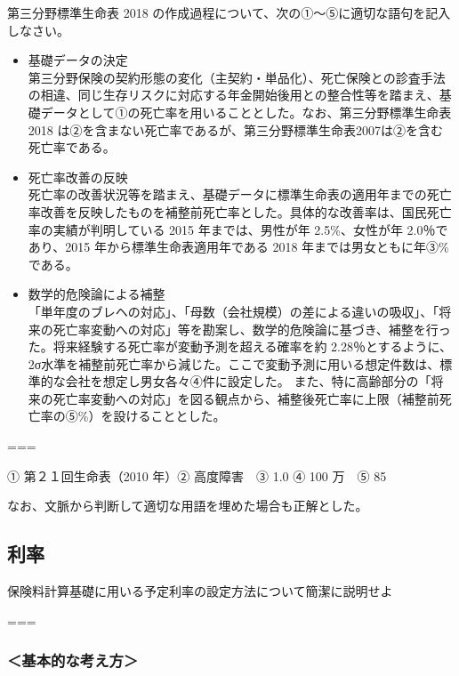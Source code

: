 \documentclass[report,gutter=10mm,fore-edge=10mm,uplatex,dvipdfmx]{jlreq}
\begin{document}

第三分野標準生命表 2018
の作成過程について、次の①～⑤に適切な語句を記入しなさい。

\begin{itemize}
\tightlist
\item
  基礎データの決定\\
  第三分野保険の契約形態の変化（主契約・単品化）、死亡保険との診査手法の相違、同じ生存リスクに対応する年金開始後用との整合性等を踏まえ、基礎データとして①の死亡率を用いることとした。なお、第三分野標準生命表2018
  は②を含まない死亡率であるが、第三分野標準生命表2007は②を含む死亡率である。
\item
  死亡率改善の反映\\
  死亡率の改善状況等を踏まえ、基礎データに標準生命表の適用年までの死亡率改善を反映したものを補整前死亡率とした。具体的な改善率は、国民死亡率の実績が判明している
  2015 年までは、男性が年 2.5\%、女性が年 2.0％であり、2015
  年から標準生命表適用年である 2018 年までは男女ともに年③\%である。
\item
  数学的危険論による補整\\
  「単年度のブレヘの対応」、「母数（会社規模）の差による違いの吸収」、「将来の死亡率変動への対応」等を勘案し、数学的危険論に基づき、補整を行った。将来経験する死亡率が変動予測を超える確率を約
  2.28％とするように、2σ水準を補整前死亡率から減じた。ここで変動予測に用いる想定件数は、標準的な会社を想定し男女各々④件に設定した。
  また、特に高齢部分の「将来の死亡率変動への対応」を図る観点から、補整後死亡率に上限（補整前死亡率の⑤\%）を設けることとした。
\end{itemize}

===


① 第２１回生命表（2010 年）② 高度障害　③ 1.0 ④ 100 万　⑤ 85

なお、文脈から判断して適切な用語を埋めた場合も正解とした。


\subsection{利率}


保険料計算基礎に用いる予定利率の設定方法について簡潔に説明せよ

===


\subsubsection{＜基本的な考え方＞}
\end{document}
